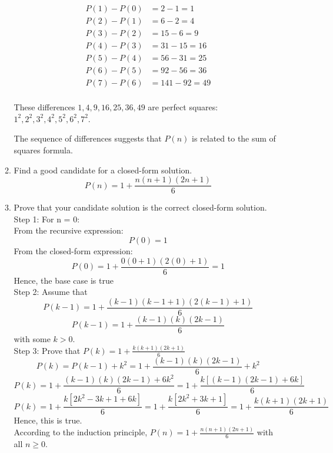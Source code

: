 \documentclass[12pt]{article}
\begin{document}
\begin{enumerate}
\begin{enumerate}
        \[
        \begin{aligned}
            P(1) - P(0) &= 2 - 1 = 1 \\
            P(2) - P(1) &= 6 - 2 = 4 \\
            P(3) - P(2) &= 15 - 6 = 9 \\
            P(4) - P(3) &= 31 - 15 = 16 \\
            P(5) - P(4) &= 56 - 31 = 25 \\
            P(6) - P(5) &= 92 - 56 = 36 \\
            P(7) - P(6) &= 141 - 92 = 49 \\
        \end{aligned}
        \]
        
        These differences \(1, 4, 9, 16, 25, 36, 49\) are perfect squares: \(1^2, 2^2, 3^2, 4^2, 5^2, 6^2, 7^2\).
        
        The sequence of differences suggests that \(P(n)\) is related to the sum of squares formula.
        

        \item Find a good candidate for a closed-form solution.
        \[P(n) = 1 + \frac{n(n+1)(2n+1)}{6}\]
        \item Prove that your candidate solution is the correct closed-form solution.\\
        Step 1: For n = 0:\\
        From the recursive expression:
        \[P(0) = 1\]
        From the closed-form expression:
        \[P(0) = 1 + \frac{0(0+1)(2(0)+1)}{6} = 1\]
        Hence, the base case is true\\
        Step 2: Assume that 
        \[P(k-1) = 1 + \frac{(k-1)(k-1+1)(2(k-1)+1)}{6}\]
        \[P(k-1) = 1 + \frac{(k-1)(k)(2k-1)}{6}\]
        with some $k > 0$.\\
        Step 3: Prove that $P(k) = 1 + \frac{k(k+1)(2k+1)}{6}$
        \[P(k) = P(k-1) + k^2 = 1 + \frac{(k-1)(k)(2k-1)}{6} + k^2\]
        \[P(k) = 1 + \frac{(k-1)(k)(2k-1) + 6k^2}{6} = 1 + \frac{k[(k-1)(2k-1)+6k]}{6} \]
        \[P(k) = 1 + \frac{k[2k^2-3k+1+6k]}{6} = 1 + \frac{k[2k^2+3k+1]}{6} = 1 + \frac{k(k+1)(2k+1)}{6}\]
        Hence, this is true.\\
        According to the induction principle, $P(n) = 1 + \frac{n(n+1)(2n+1)}{6}$ with all $n \geq 0$.
    \end{enumerate}


\end{enumerate}
\end{document}
